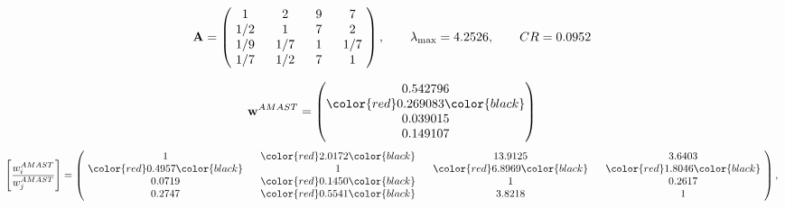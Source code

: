 \begin{example}
\begin{equation*}
\mathbf{A} =
\begin{pmatrix}
$\,\,$ 1 $\,\,$ & $\,\,$2$\,\,$ & $\,\,$9$\,\,$ & $\,\,$7 $\,\,$ \\
$\,\,$ 1/2$\,\,$ & $\,\,$ 1 $\,\,$ & $\,\,$7$\,\,$ & $\,\,$2 $\,\,$ \\
$\,\,$ 1/9$\,\,$ & $\,\,$ 1/7$\,\,$ & $\,\,$ 1 $\,\,$ & $\,\,$ 1/7 $\,\,$ \\
$\,\,$ 1/7$\,\,$ & $\,\,$ 1/2$\,\,$ & $\,\,$7$\,\,$ & $\,\,$ 1  $\,\,$ \\
\end{pmatrix},
\qquad
\lambda_{\max} =
4.2526,
\qquad
CR = 0.0952
\end{equation*}

\begin{equation*}
\mathbf{w}^{AMAST} =
\begin{pmatrix}
0.542796\\
\color{red} 0.269083\color{black} \\
0.039015\\
0.149107
\end{pmatrix}\end{equation*}
\begin{equation*}
\left[ \frac{{w}^{AMAST}_i}{{w}^{AMAST}_j} \right] =
\begin{pmatrix}
$\,\,$ 1 $\,\,$ & $\,\,$\color{red} 2.0172\color{black} $\,\,$ & $\,\,$13.9125$\,\,$ & $\,\,$3.6403$\,\,$ \\
$\,\,$\color{red} 0.4957\color{black} $\,\,$ & $\,\,$ 1 $\,\,$ & $\,\,$\color{red} 6.8969\color{black} $\,\,$ & $\,\,$\color{red} 1.8046\color{black}   $\,\,$ \\
$\,\,$0.0719$\,\,$ & $\,\,$\color{red} 0.1450\color{black} $\,\,$ & $\,\,$ 1 $\,\,$ & $\,\,$0.2617 $\,\,$ \\
$\,\,$0.2747$\,\,$ & $\,\,$\color{red} 0.5541\color{black} $\,\,$ & $\,\,$3.8218$\,\,$ & $\,\,$ 1  $\,\,$ \\
\end{pmatrix},
\end{equation*}


\end{example}
